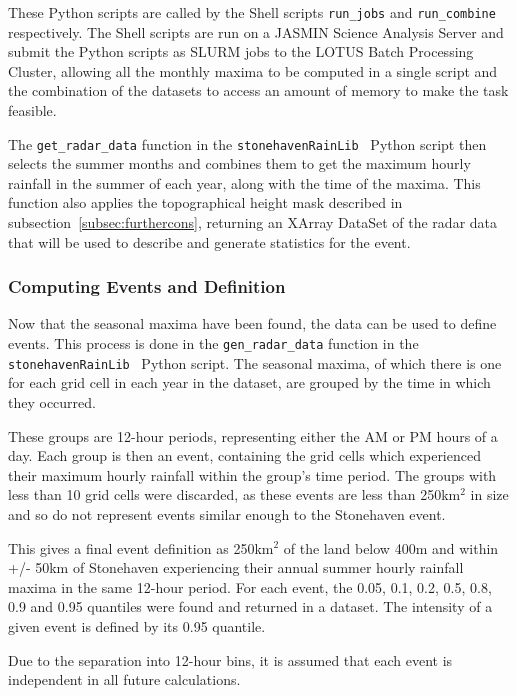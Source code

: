 These Python scripts are called by the Shell scripts \texttt{run\_jobs} and \texttt{run\_combine}~\cite{Me_Code} respectively.
The Shell scripts are run on a JASMIN Science Analysis Server and submit the Python scripts as SLURM jobs to the LOTUS Batch Processing Cluster,
    allowing all the monthly maxima to be computed in a single script and the combination of the datasets to access an amount of memory to make the task feasible.

The \texttt{get\_radar\_data} function in the \texttt{stonehavenRainLib}~\cite{Me_Code} Python script then selects the summer months and
    combines them to get the maximum hourly rainfall in the summer of each year,
    along with the time of the maxima.
This function also applies the topographical height mask described in subsection~\ref{subsec:furthercons},
    returning an XArray DataSet of the radar data that will be used to describe and generate statistics for the event.

\subsubsection{Computing Events and Definition}

Now that the seasonal maxima have been found,
    the data can be used to define events.
This process is done in the \texttt{gen\_radar\_data} function in the \texttt{stonehavenRainLib}~\cite{Me_Code} Python script.
The seasonal maxima,
    of which there is one for each grid cell in each year in the dataset,
    are grouped by the time in which they occurred.

These groups are 12-hour periods,
    representing either the AM or PM hours of a day.
Each group is then an event,
    containing the grid cells which experienced their maximum hourly rainfall within the group's time period.
The groups with less than 10 grid cells were discarded,
    as these events are less than 250km$^2$ in size and
    so do not represent events similar enough to the Stonehaven event.

This gives a final event definition as 250km$^2$ of the land below 400m and within +/- 50km of Stonehaven
    experiencing their annual summer hourly rainfall maxima in the same 12-hour period.
For each event, the 0.05, 0.1, 0.2, 0.5, 0.8, 0.9 and 0.95 quantiles were found and returned in a dataset.
The intensity of a given event is defined by its 0.95 quantile.

Due to the separation into 12-hour bins,
    it is assumed that each event is independent in all future calculations.

